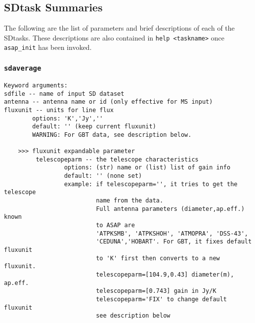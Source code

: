 \subsection{SDtask Summaries}
\label{section:sd.sdtasks.tasks}

The following are the list of parameters and
brief descriptions of each of the SDtasks.
These descriptions are also contained in {\tt help <taskname>} once {\tt asap\_init} has been invoked.

\subsubsection{{\tt sdaverage}}
\label{section:sd.sdtasks.tasks.sdaverage}

\begin{verbatim}
Keyword arguments:
sdfile -- name of input SD dataset
antenna -- antenna name or id (only effective for MS input)
fluxunit -- units for line flux
        options: 'K','Jy',''
        default: '' (keep current fluxunit)
        WARNING: For GBT data, see description below.
        
    >>> fluxunit expandable parameter
         telescopeparm -- the telescope characteristics
                 options: (str) name or (list) list of gain info
                 default: '' (none set)
                 example: if telescopeparm='', it tries to get the telescope
                          name from the data.
                          Full antenna parameters (diameter,ap.eff.) known
                          to ASAP are
                          'ATPKSMB', 'ATPKSHOH', 'ATMOPRA', 'DSS-43',
                          'CEDUNA','HOBART'. For GBT, it fixes default fluxunit
                          to 'K' first then converts to a new fluxunit.
                          telescopeparm=[104.9,0.43] diameter(m), ap.eff.
                          telescopeparm=[0.743] gain in Jy/K
                          telescopeparm='FIX' to change default fluxunit
                          see description below


\end{verbatim}
